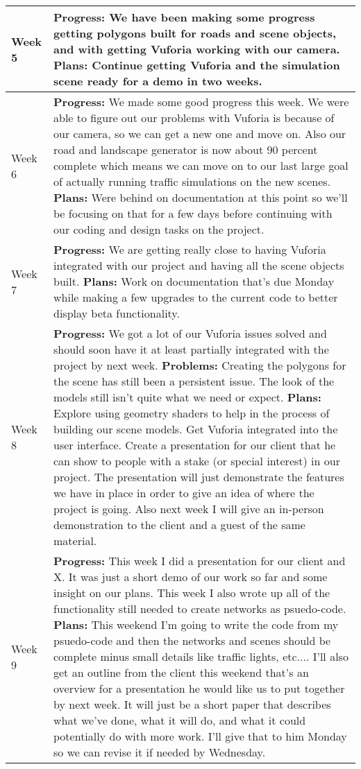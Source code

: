 \documentclass[letterpaper, 10pt, onecolumn, draftclsnofoot]{IEEEtran}
\begin{document}
\begin{center}
\begin{longtable}{|p{4cm}|p{10cm}|}
            \hline
            Week 5 & \textbf{Progress:} We have been making some progress getting polygons built for roads and scene objects, and with getting Vuforia working with our camera. \textbf{Plans:} Continue getting Vuforia and the simulation scene ready for a demo in two weeks. \\
            \hline
            Week 6 & \textbf{Progress:} We made some good progress this week. We were able to figure out our problems with Vuforia is because of our camera, so we can get a new one and move on. Also our road and landscape generator is now about 90 percent complete which means we can move on to our last large goal of actually running traffic simulations on the new scenes. \textbf{Plans:} Were behind on documentation at this point so we'll be focusing on that for a few days before continuing with our coding and design tasks on the project. \\
            \hline
            Week 7 & \textbf{Progress:} We are getting really close to having Vuforia integrated with our project and having all the scene objects built. \textbf{Plans:} Work on documentation that's due Monday while making a few upgrades to the current code to better display beta functionality. \\
            \hline
            Week 8 & \textbf{Progress:} We got a lot of our Vuforia issues solved and should soon have it at least partially integrated with the project by next week. \textbf{Problems:} Creating the polygons for the scene has still been a persistent issue. The look of the models still isn't quite what we need or expect. \textbf{Plans:} Explore using geometry shaders to help in the process of building our scene models. Get Vuforia integrated into the user interface. Create a presentation for our client that he can show to people with a stake (or special interest) in our project. The presentation will just demonstrate the features we have in place in order to give an idea of where the project is going. Also next week I will give an in-person demonstration to the client and a guest of the same material. \\
            \hline
            Week 9 & \textbf{Progress:} This week I did a presentation for our client and X. It was just a short demo of our work so far and some insight on our plans. This week I also wrote up all of the functionality still needed to create networks as psuedo-code. \textbf{Plans:} This weekend I'm going to write the code from my psuedo-code and then the networks and scenes should be complete minus small details like traffic lights, etc.... I'll also get an outline from the client this weekend that's an overview for a presentation he would like us to put together by next week. It will just be a short paper that describes what we've done, what it will do, and what it could potentially do with more work. I'll give that to him Monday so we can revise it if needed by Wednesday. \\

\end{longtable}
\end{center}
\end{document}
